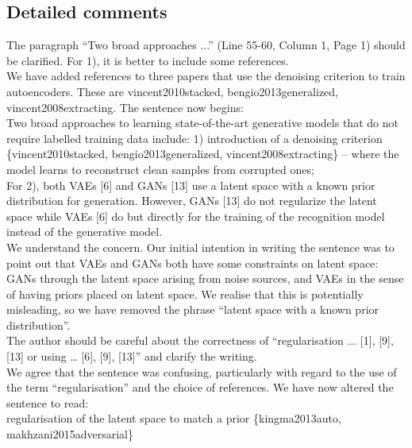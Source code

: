 \documentclass[a4paper,11pt]{article}
\begin{document}
\subsection*{Detailed comments}

{\color{blue}
The paragraph ``Two broad approaches ...'' (Line 55-60, Column 1, Page 1) should be clarified. For 1), it is better to include some references. }  \\

We have added references to three papers that use the denoising criterion to train autoencoders.
These are {\color{red} vincent2010stacked, bengio2013generalized, vincent2008extracting}.  The sentence now begins:\\

{\color{red} Two broad approaches to learning state-of-the-art generative models that do not require labelled training data include: 1) introduction of a denoising criterion \{vincent2010stacked, bengio2013generalized,  vincent2008extracting\} -- where the model learns to reconstruct clean samples from corrupted ones;}\\

{\color{blue} For 2), both VAEs [6] and GANs [13] use a latent space with a known prior distribution for generation. However, GANs [13] do not regularize the latent space while VAEs [6] do but directly for the training of the recognition model instead of the generative model.}\\

We understand the concern. Our initial intention in writing the sentence was to point out that VAEs and GANs both have some constraints on latent space: GANs through the latent space arising from noise sources, and VAEs in the sense of having priors placed on latent space. We realise that this is potentially misleading, so we have removed the phrase ``latent space with a known prior distribution''. \\

{\color{blue} The author should be careful about the correctness of ``regularisation ... [1], [9], [13] or using … [6], [9], [13]'' and clarify the writing.} \\

We agree that the sentence was confusing, particularly with regard to the use of the term ``regularisation'' and the choice of references. We have now altered the sentence to read:\\

{\color{red} regularisation of the latent space to match a prior \{kingma2013auto, makhzani2015adversarial\}}\\
\end{document}
